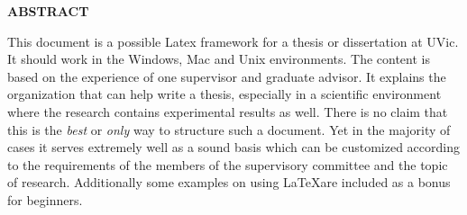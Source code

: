 \newpage
{}


\begin{center}
\textbf{ABSTRACT}
\end{center}

This document is a possible Latex framework for a thesis or dissertation at UVic. It should work in the Windows, Mac and Unix environments. The content is based on the experience of one supervisor and graduate advisor. It explains the organization that can help write a thesis, especially in a scientific environment where the research contains experimental results as well. There is no claim that this is the \textit{best} or \textit{only} way to structure such a document. Yet in the majority of cases it serves extremely well as a sound basis which can be customized according to the requirements of the members of the supervisory committee and the topic of  research. Additionally some examples on using \LaTeX are included as a bonus for beginners.
